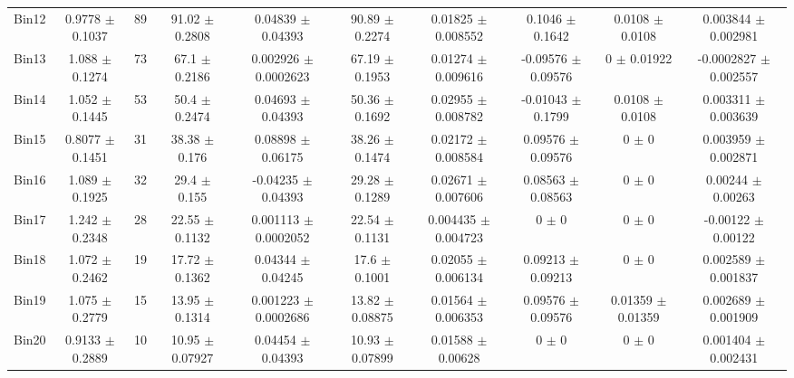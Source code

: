 \begin{tabular}{@{\extracolsep{4pt}}lccccccccc@{}}
     Bin12 & 0.9778 $\pm$ 0.1037 & 89 & 91.02 $\pm$ 0.2808 & 0.04839 $\pm$ 0.04393 & 90.89 $\pm$ 0.2274 & 0.01825 $\pm$ 0.008552 & 0.1046 $\pm$ 0.1642 & 0.0108 $\pm$ 0.0108 & 0.003844 $\pm$ 0.002981 \\ 
     Bin13 & 1.088 $\pm$ 0.1274 & 73 & 67.1 $\pm$ 0.2186 & 0.002926 $\pm$ 0.0002623 & 67.19 $\pm$ 0.1953 & 0.01274 $\pm$ 0.009616 & -0.09576 $\pm$ 0.09576 & 0 $\pm$ 0.01922 & -0.0002827 $\pm$ 0.002557 \\ 
     Bin14 & 1.052 $\pm$ 0.1445 & 53 & 50.4 $\pm$ 0.2474 & 0.04693 $\pm$ 0.04393 & 50.36 $\pm$ 0.1692 & 0.02955 $\pm$ 0.008782 & -0.01043 $\pm$ 0.1799 & 0.0108 $\pm$ 0.0108 & 0.003311 $\pm$ 0.003639 \\ 
     Bin15 & 0.8077 $\pm$ 0.1451 & 31 & 38.38 $\pm$ 0.176 & 0.08898 $\pm$ 0.06175 & 38.26 $\pm$ 0.1474 & 0.02172 $\pm$ 0.008584 & 0.09576 $\pm$ 0.09576 & 0 $\pm$ 0 & 0.003959 $\pm$ 0.002871 \\ 
     Bin16 & 1.089 $\pm$ 0.1925 & 32 & 29.4 $\pm$ 0.155 & -0.04235 $\pm$ 0.04393 & 29.28 $\pm$ 0.1289 & 0.02671 $\pm$ 0.007606 & 0.08563 $\pm$ 0.08563 & 0 $\pm$ 0 & 0.00244 $\pm$ 0.00263 \\ 
     Bin17 & 1.242 $\pm$ 0.2348 & 28 & 22.55 $\pm$ 0.1132 & 0.001113 $\pm$ 0.0002052 & 22.54 $\pm$ 0.1131 & 0.004435 $\pm$ 0.004723 & 0 $\pm$ 0 & 0 $\pm$ 0 & -0.00122 $\pm$ 0.00122 \\ 
     Bin18 & 1.072 $\pm$ 0.2462 & 19 & 17.72 $\pm$ 0.1362 & 0.04344 $\pm$ 0.04245 & 17.6 $\pm$ 0.1001 & 0.02055 $\pm$ 0.006134 & 0.09213 $\pm$ 0.09213 & 0 $\pm$ 0 & 0.002589 $\pm$ 0.001837 \\ 
     Bin19 & 1.075 $\pm$ 0.2779 & 15 & 13.95 $\pm$ 0.1314 & 0.001223 $\pm$ 0.0002686 & 13.82 $\pm$ 0.08875 & 0.01564 $\pm$ 0.006353 & 0.09576 $\pm$ 0.09576 & 0.01359 $\pm$ 0.01359 & 0.002689 $\pm$ 0.001909 \\ 
     Bin20 & 0.9133 $\pm$ 0.2889 & 10 & 10.95 $\pm$ 0.07927 & 0.04454 $\pm$ 0.04393 & 10.93 $\pm$ 0.07899 & 0.01588 $\pm$ 0.00628 & 0 $\pm$ 0 & 0 $\pm$ 0 & 0.001404 $\pm$ 0.002431 \\ 
\hline\hline
  \end{tabular}
